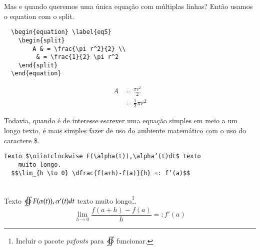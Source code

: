 \begin{frame}[fragile]
    Mas e quando queremos uma única equação com múltiplas linhas? Então usamos o {\code equation} com o {\code split}.

\vspace{0.5cm}
\begin{CenteredBox}
\begin{lstlisting}
  \begin{equation} \label{eq5}
    \begin{split}
        A & = \frac{\pi r^2}{2} \\
         & = \frac{1}{2} \pi r^2
    \end{split}
  \end{equation}
\end{lstlisting}
\end{CenteredBox}    

\begin{equation} \label{eq5}
\begin{split}
    A & = \frac{\pi r^2}{2} \\
     & = \frac{1}{2} \pi r^2
\end{split}
\end{equation}


\end{frame}

\begin{frame}[fragile]
    Todavia, quando é de interesse escrever uma equação simples em meio a um longo texto, é mais simples fazer de uso do ambiente matemático com o uso do caractere \$. 
\vspace{0.3cm}
\begin{center}
\begin{verbatim}
Texto $\oiintclockwise F(\alpha(t)),\alpha’(t)dt$ texto 
    muito longo.
  $$\lim_{h \to 0} \dfrac{f(a+h)-f(a)}{h} =: f’(a)$$
\end{verbatim}
\hrulefill\\
\vspace{0.3cm}
    Texto $\oiintclockwise F(\alpha(t)),\alpha'(t)dt$ texto  muito longo\footnote{Incluir o pacote \textit{pxfonts} para $\oiintclockwise$ funcionar.}.
\vspace{0.25cm}
    $$\lim_{h \to 0} \dfrac{f(a+h)-f(a)}{h} =: f'(a)$$
\end{center}
\end{frame}

